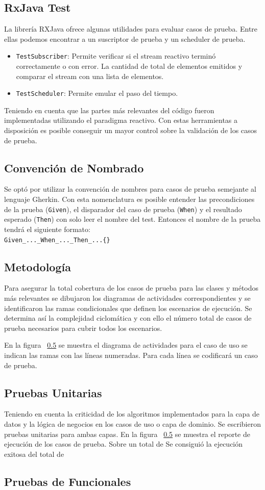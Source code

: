 \subsection{RxJava Test}
La librería RXJava ofrece algunas utilidades para evaluar casos de prueba. Entre ellas podemos encontrar a un suscriptor de prueba y un scheduler de prueba.
\begin{itemize}
	\item \texttt{TestSubscriber}: Permite verificar si el stream reactivo terminó correctamente o con error. La cantidad de total de elementos emitidos y comparar el stream con una lista de elementos. 
	\item \texttt{TestScheduler}: Permite emular el paso del tiempo. 
\end{itemize}
Teniendo en cuenta que las partes más relevantes del código fueron implementadas utilizando el paradigma reactivo. Con estas herramientas a disposición es posible conseguir un mayor control sobre la validación de los casos de prueba.

\subsection{Convención de Nombrado}
Se optó por utilizar la convención de nombres para casos de prueba semejante al lenguaje Gherkin. Con esta nomenclatura es posible entender las precondiciones de la prueba (\texttt{Given}), el disparador del caso de prueba (\texttt{When}) y el resultado esperado (\texttt{Then}) con solo leer el nombre del test.
Entonces el nombre de la prueba tendrá el siguiente formato:\\
\texttt{Given\_...\_When\_...\_Then\_...\{\}}

\subsection{Metodología}
Para asegurar la total cobertura de los casos de prueba para las clases y métodos más relevantes se dibujaron los diagramas de actividades correspondientes y se identificaron las ramas condicionales que definen los escenarios de ejecución. Se determina así la complejidad ciclomática y con ello el número total de casos de prueba necesarios para cubrir todos los escenarios.

En la figura ~\ref{} se muestra el diagrama de actividades para el caso de uso se indican las ramas con las líneas numeradas. Para cada línea se codificará un caso de prueba.

\subsection{Pruebas Unitarias}
Teniendo en cuenta la criticidad de los algoritmos implementados para la capa de datos y la lógica de negocios en los casos de uso o capa de dominio. Se escribieron pruebas unitarias para ambas capas. En la figura ~\ref{} se muestra el reporte de ejecución de los casos de prueba. Sobre un total de Se consiguió la ejecución exitosa del total de  
\subsection{Pruebas de Funcionales}